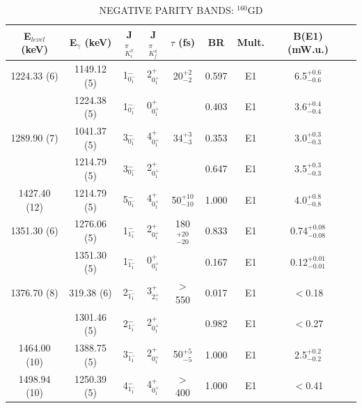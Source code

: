 \begin{table}[h!]    
\begin{center}
\caption{NEGATIVE PARITY BANDS: $^{160}$GD \label{tab:160Gd_negparity}}
                            
\begin{tabular}{ccccccccc}
E$_{level}$ (keV) & E$_\gamma$ (keV) & J$^\pi_{K^\pi_i}$ & J$^\pi_{K^\pi_f}$ & $\tau$ (fs) & BR & Mult. &   B(E1) (mW.u.)\\
\hline
\hline
1224.33 (6)  & 1149.12 (5) & 1$^-_{0^-_1}$ & 2$^+_{0^+_1}$ & 20$^{+2}_{-2}$   & 0.597 & E1   & 6.5$^{+0.6}_{-0.6}$ &\\
             & 1224.38 (5) & 1$^-_{0^-_1}$ & 0$^+_{0^+_1}$ &                  & 0.403 & E1   & 3.6$^{+0.4}_{-0.4}$ &\\
1289.90 (7)  & 1041.37 (5) & 3$^-_{0^-_1}$ & 4$^+_{0^+_1}$ & 34$^{+3}_{-3}$   & 0.353 & E1   & 3.0$^{+0.3}_{-0.3}$ &\\
             & 1214.79 (5) & 3$^-_{0^-_1}$ & 2$^+_{0^+_1}$ &                  & 0.647 & E1   & 3.5$^{+0.3}_{-0.3}$ &\\
1427.40 (12) & 1214.79 (5) & 5$^-_{0^-_1}$ & 4$^+_{0^+_1}$ & 50$^{+10}_{-10}$ & 1.000 & E1   & 4.0$^{+0.8}_{-0.8}$ &\\
\hline
1351.30 (6)  & 1276.06 (5) & 1$^-_{1^-_1}$ & 2$^+_{0^+_1}$ & 180$^{+20}_{-20}$      & 0.833 & E1   & 0.74$^{+0.08}_{-0.08}$ &\\
             & 1351.30 (5) & 1$^-_{1^-_1}$ & 0$^+_{0^+_1}$ &                        & 0.167 & E1   & 0.12$^{+0.01}_{-0.01}$ &\\
1376.70 (8)  &  319.38 (6) & 2$^-_{1^-_1}$ & 3$^+_{2^+_\gamma}$ & $>$550            & 0.017 & E1   & $<$0.18 &\\
             & 1301.46 (5) & 2$^-_{1^-_1}$ & 2$^+_{0^+_1}$ &                        & 0.982 & E1   & $<$0.27 &\\
1464.00 (10) & 1388.75 (5) & 3$^-_{1^-_1}$ & 2$^+_{0^+_1}$ & 50$^{+5}_{-5}$         & 1.000 & E1  & 2.5$^{+0.2}_{-0.2}$ &\\
1498.94 (10) & 1250.39 (5) & 4$^-_{1^-_1}$ & 4$^+_{0^+_1}$ & $>$400                 & 1.000 & E1  & $<$0.41  &\\


\end{tabular}
\end{center}
\end{table}
